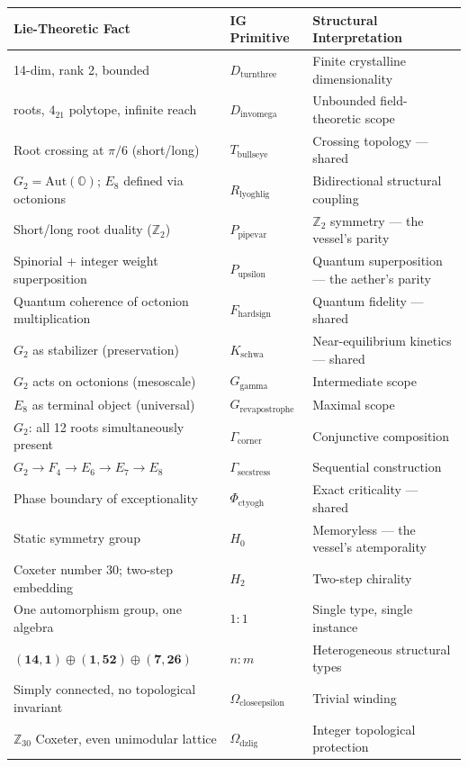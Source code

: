 \documentclass[12pt,a4paper]{article}
\begin{document}
\begin{table}[htbp]
\centering
\small
{}
\begin{tabularx}{\textwidth}{>{\centering\arraybackslash}X >{\centering\arraybackslash}X >{\centering\arraybackslash}X}
\toprule
\rowcolor{gray!25}\textbf{Lie-Theoretic Fact} & \textbf{IG Primitive} & \textbf{Structural Interpretation} \\
\midrule
\rowcolors{1}{white}{gray!10}
14-dim, rank 2, bounded & $D_{\text{turnthree}}$ & Finite crystalline dimensionality \\
240 roots, $4_{21}$ polytope, infinite reach & $D_{\text{invomega}}$ & Unbounded field-theoretic scope \\
Root crossing at $\pi/6$ (short/long) & $T_{\text{bullseye}}$ & Crossing topology --- shared \\
$G_2 = \text{Aut}(\mathbb{O})$; $E_8$ defined via octonions & $R_{\text{lyoghlig}}$ & Bidirectional structural coupling \\
Short/long root duality ($\mathbb{Z}_2$) & $P_{\text{pipevar}}$ & $\mathbb{Z}_2$ symmetry --- the vessel's parity \\
Spinorial + integer weight superposition & $P_{\text{upsilon}}$ & Quantum superposition --- the aether's parity \\
Quantum coherence of octonion multiplication & $F_{\text{hardsign}}$ & Quantum fidelity --- shared \\
$G_2$ as stabilizer (preservation) & $K_{\text{schwa}}$ & Near-equilibrium kinetics --- shared \\
$G_2$ acts on octonions (mesoscale) & $G_{\text{gamma}}$ & Intermediate scope \\
$E_8$ as terminal object (universal) & $G_{\text{revapostrophe}}$ & Maximal scope \\
$G_2$: all 12 roots simultaneously present & $\Gamma_{\text{corner}}$ & Conjunctive composition \\
$G_2 \to F_4 \to E_6 \to E_7 \to E_8$ & $\Gamma_{\text{secstress}}$ & Sequential construction \\
Phase boundary of exceptionality & $\Phi_{\text{ctyogh}}$ & Exact criticality --- shared \\
Static symmetry group & $H_0$ & Memoryless --- the vessel's atemporality \\
Coxeter number 30; two-step embedding & $H_2$ & Two-step chirality \\
One automorphism group, one algebra & $1{:}1$ & Single type, single instance \\
$(\mathbf{14},\mathbf{1}) \oplus (\mathbf{1},\mathbf{52}) \oplus (\mathbf{7},\mathbf{26})$ & $n{:}m$ & Heterogeneous structural types \\
Simply connected, no topological invariant & $\Omega_{\text{closeepsilon}}$ & Trivial winding \\
$\mathbb{Z}_{30}$ Coxeter, even unimodular lattice & $\Omega_{\text{dzlig}}$ & Integer topological protection \\
\bottomrule
\end{tabularx}
\end{table}
\end{document}

